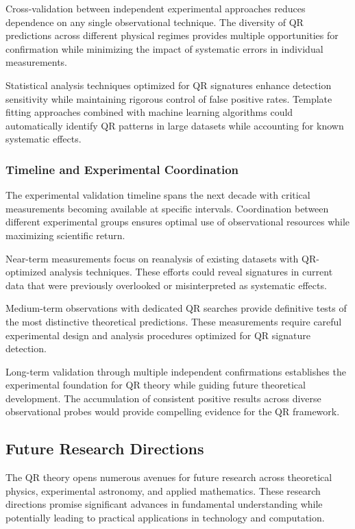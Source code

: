 Cross-validation between independent experimental approaches reduces dependence on any single observational technique. The diversity of QR predictions across different physical regimes provides multiple opportunities for confirmation while minimizing the impact of systematic errors in individual measurements.

Statistical analysis techniques optimized for QR signatures enhance detection sensitivity while maintaining rigorous control of false positive rates. Template fitting approaches combined with machine learning algorithms could automatically identify QR patterns in large datasets while accounting for known systematic effects.

\subsubsection{Timeline and Experimental Coordination}
\label{subsubsec:timeline-coordination}

The experimental validation timeline spans the next decade with critical measurements becoming available at specific intervals. Coordination between different experimental groups ensures optimal use of observational resources while maximizing scientific return.

Near-term measurements focus on reanalysis of existing datasets with QR-optimized analysis techniques. These efforts could reveal signatures in current data that were previously overlooked or misinterpreted as systematic effects.

Medium-term observations with dedicated QR searches provide definitive tests of the most distinctive theoretical predictions. These measurements require careful experimental design and analysis procedures optimized for QR signature detection.

Long-term validation through multiple independent confirmations establishes the experimental foundation for QR theory while guiding future theoretical development. The accumulation of consistent positive results across diverse observational probes would provide compelling evidence for the QR framework.

\subsection{Future Research Directions}
\label{subsec:future-research}

The QR theory opens numerous avenues for future research across theoretical physics, experimental astronomy, and applied mathematics. These research directions promise significant advances in fundamental understanding while potentially leading to practical applications in technology and computation.


